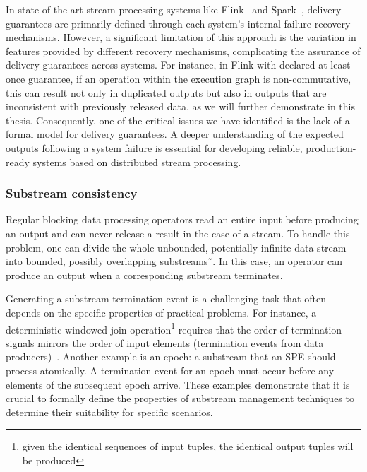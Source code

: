 In state-of-the-art stream processing systems like Flink~\cite{Carbone:2017:SMA:3137765.3137777} and Spark~\cite{Zaharia:2012:DSE:2342763.2342773}, delivery guarantees are primarily defined through each system's internal failure recovery mechanisms. However, a significant limitation of this approach is the variation in features provided by different recovery mechanisms, complicating the assurance of delivery guarantees across systems. For instance, in Flink with declared at-least-once guarantee, if an operation within the execution graph is non-commutative, this can result not only in duplicated outputs but also in outputs that are inconsistent with previously released data, as we will further demonstrate in this thesis. Consequently, one of the critical issues we have identified is the lack of a formal model for delivery guarantees. A deeper understanding of the expected outputs following a system failure is essential for developing reliable, production-ready systems based on distributed stream processing.

\subsubsection{Substream consistency}


Regular blocking data processing operators read an entire input before producing an output and can never release a result in the case of a stream. To handle this problem, one can divide the whole unbounded, potentially infinite data stream into bounded, possibly overlapping substreams˜\cite{tucker2003exploiting}. In this case, an operator can produce an output when a corresponding substream terminates.

Generating a substream termination event is a challenging task that often depends on the specific properties of practical problems. For instance, a deterministic windowed join operation\footnote{given the identical sequences of input tuples, the identical output tuples will be produced} requires that the order of termination signals mirrors the order of input elements (termination events from data producers)~\cite{najdataei2019stretch, gulisano2016scalejoin}. Another example is an epoch: a substream that an SPE should process atomically. A termination event for an epoch must occur before any elements of the subsequent epoch arrive. These examples demonstrate that it is crucial to formally define the properties of substream management techniques to determine their suitability for specific scenarios.

